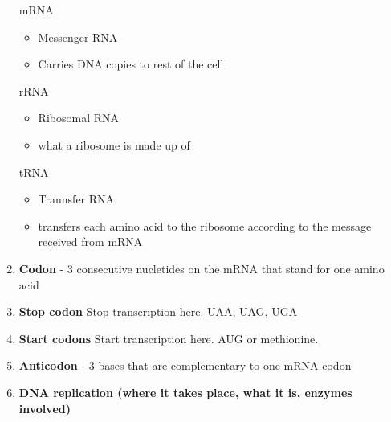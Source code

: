 \documentclass[9pt]{article}
\begin{document}
\begin{enumerate}
  mRNA
  \begin{itemize}
    \item Messenger RNA
    \item Carries DNA copies to rest of the cell
  \end{itemize}
  rRNA
  \begin{itemize}
    \item Ribosomal RNA
    \item what a ribosome is made up of
  \end{itemize}
  tRNA
  \begin{itemize}
    \item Trannsfer RNA
    \item transfers each amino acid to the ribosome according to the message received from mRNA
  \end{itemize}
  \item {\bf Codon} - 3 consecutive nucletides on the mRNA that stand for one amino acid
  \item {\bf Stop codon} Stop transcription here. UAA, UAG, UGA
  \item {\bf Start codons} Start transcription here. AUG or methionine.
  \item {\bf Anticodon} - 3 bases that are complementary to one mRNA codon
  \item {\bf DNA replication (where it takes place, what it is, enzymes involved)}
  

\end{enumerate}
\end{document}
